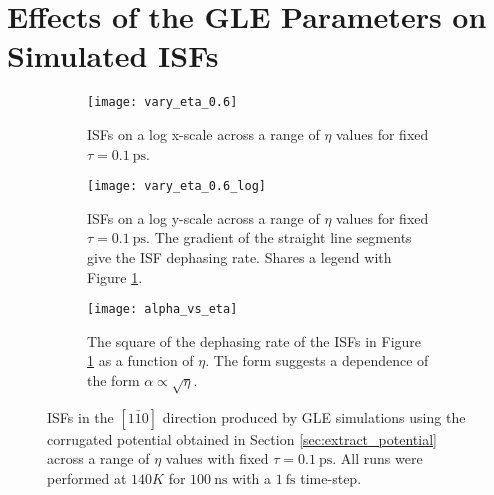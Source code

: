 \section{Effects of the GLE Parameters on Simulated ISFs}

\begin{figure}
	\begin{subfigure}{1.0\textwidth}
		\texttt{[image: vary\_eta\_0.6]}
		\caption{ISFs on a log x-scale across a range of $\eta$ values for fixed $\tau=\SI{0.1}{\ps}$.}
		\label{fig:vary_eta_0.6}
	\end{subfigure}	
	\begin{subfigure}{0.49\textwidth}
		\texttt{[image: vary\_eta\_0.6\_log]}
		\caption{ISFs on a log y-scale across a range of $\eta$ values for fixed $\tau=\SI{0.1}{\ps}$. The gradient of the straight line segments give the ISF dephasing rate. Shares a legend with Figure \ref{fig:vary_eta_0.6}.}
		\label{fig:vary_eta_0.6_log}
	\end{subfigure}
	\hfill
	\begin{subfigure}{0.49\textwidth}
		\texttt{[image: alpha\_vs\_eta]}
		\caption{The square of the dephasing rate of the ISFs in Figure \ref{fig:vary_eta_0.6} as a function of $\eta$. The form suggests a dependence of the form $\alpha \propto \sqrt{\eta}$.}
		\label{fig:alpha_vs_eta}
	\end{subfigure}
	\caption{ISFs in the $\left[1\bar{1}0\right]$ direction produced by GLE simulations using the corrugated potential obtained in Section \ref{sec:extract_potential} across a range of $\eta$ values with fixed $\tau=\SI{0.1}{\ps}$. All runs were performed at $140K$ for $\SI{100}{\ns}$ with a $\SI{1}{\fs}$ time-step.}
	\label{fig:vary_eta_all}
\end{figure}


